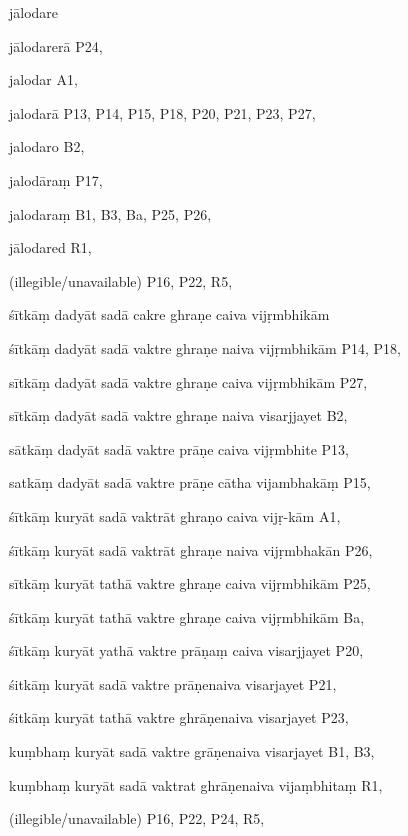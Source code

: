 \begin{ekdosis}
\begin{marma}[hp01_055]
\begin{marma}[hp02_009]
\begin{marma}[hp02_011]
\begin{marma}[hp02_53a]
\item[jālodare]
\item[jālodarerā] P24, 
\item[jalodar] A1,
\item[jalodarā] P13, P14, P15, P18, P20, P21, P23, P27, 
\item[jalodaro] B2,
\item[jalodāraṃ] P17,
\item[jalodaraṃ] B1, B3, Ba, P25, P26, 
\item[jālodared] R1,
\item[(illegible/unavailable)] P16, P22, R5,

  \begin{description}

    \end{description}
 \end{marma}


\begin{marma}[hp02_55ab]
\item[śītkāṃ dadyāt sadā cakre ghraṇe caiva vijṛmbhikām]
\item[śītkāṃ dadyāt sadā vaktre ghraṇe naiva vijṛmbhikām] P14, P18, 
\item[sītkāṃ dadyāt sadā vaktre ghraṇe caiva vijṛmbhikām] P27,
\item[sītkāṃ dadyāt sadā vaktre ghraṇe naiva visarjjayet] B2,
\item[sātkāṃ dadyāt sadā vaktre prāṇe caiva vijṛmbhite] P13,
\item[satkāṃ dadyāt sadā vaktre prāṇe cātha vijambhakāṃ] P15,
\item[śītkāṃ kuryāt sadā vaktrāt ghraṇo caiva vijṛ-kām] A1,
\item[śītkāṃ kuryāt sadā vaktrāt ghraṇe naiva vijṛmbhakān] P26,
\item[sītkāṃ kuryāt tathā vaktre ghraṇe caiva vijṛmbhikām] P25,  
\item[śītkāṃ kuryāt tathā vaktre ghraṇe caiva vijṛmbhikām] Ba,  
\item[śītkāṃ kuryāt yathā vaktre prāṇaṃ caiva visarjjayet] P20, 
\item[śitkāṃ kuryāt sadā vaktre prāṇenaiva visarjayet] P21,
\item[śitkāṃ kuryāt tathā vaktre ghrāṇenaiva visarjayet] P23, 
\item[kuṃbhaṃ kuryāt sadā vaktre grāṇenaiva visarjayet] B1, B3, 
\item[kuṃbhaṃ kuryāt sadā vaktrat ghrāṇenaiva vijaṃbhitaṃ] R1, 
\item[(illegible/unavailable)] P16, P22, P24, R5,


\end{marma}
\end{marma}
\end{marma}
\end{marma}
\end{ekdosis}
